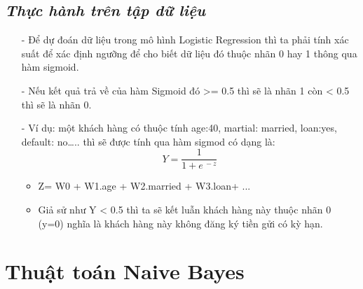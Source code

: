 \documentclass{report}
\begin{document}
\subsection{\textit{Thực hành trên tập dữ liệu}}
    \fontsize{13}{14}\selectfont
            \begin{enumerate}
                \item[- ] Để dự đoán dữ liệu trong mô hình Logistic Regression thì ta phải tính xác suất để xác định ngưỡng để cho biết dữ liệu đó thuộc nhãn 0 hay 1 thông qua hàm sigmoid.
                \item[- ] Nếu kết quả trả về của hàm Sigmoid đó >= 0.5 thì sẽ là nhãn 1 còn < 0.5 thì sẽ là nhãn 0.
                \item[- ] Ví dụ: một khách hàng có thuộc tính {age:40, martial: married, loan:yes, default: no…..} thì sẽ được tính qua hàm sigmod có dạng là:  
                $$ Y = \frac{1}{1 + e^{\ -z}} $$ 
                \begin{itemize}
                \item Z= W0 + W1.age + W2.married + W3.loan+ ...
                \item Giả sử như Y < 0.5 thì ta sẽ kết luẫn khách hàng này thuộc nhãn 0 (y=0) nghĩa là khách hàng này không đăng ký tiền gửi có kỳ hạn.
                \end{itemize}
            \end{enumerate}

\fontsize{14}{10}\selectfont
\section{Thuật toán Naive Bayes}
\end{document}
